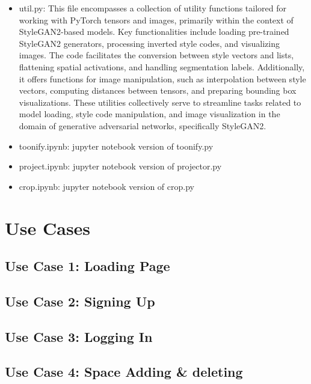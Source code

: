 \documentclass[conference]{IEEEtran}
\begin{document}
\begin{itemize}
                \vspace{3mm}
                \item util.py: This file encompasses a collection of utility functions tailored for working with PyTorch tensors and images, primarily within the context of StyleGAN2-based models. Key functionalities include loading pre-trained StyleGAN2 generators, processing inverted style codes, and visualizing images. The code facilitates the conversion between style vectors and lists, flattening spatial activations, and handling segmentation labels. Additionally, it offers functions for image manipulation, such as interpolation between style vectors, computing distances between tensors, and preparing bounding box visualizations. These utilities collectively serve to streamline tasks related to model loading, style code manipulation, and image visualization in the domain of generative adversarial networks, specifically StyleGAN2.\\
                \vspace{3mm}
                \item toonify.ipynb: jupyter notebook version of toonify.py\\
                \item project.ipynb: jupyter notebook version of projector.py\\
                \item crop.ipynb: jupyter notebook version of crop.py\\

            \end{itemize}
    
\section{Use Cases}
    \subsection{Use Case 1: Loading Page}
    \subsection{Use Case 2: Signing Up}
    \subsection{Use Case 3: Logging In}
    \subsection{Use Case 4: Space Adding \& deleting}
\end{document}
